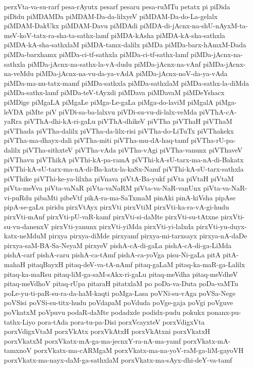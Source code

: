 {perxVta-va-su-rarf
pesa-rAyutx
pesarf
pesaru
pesa-ruMTu
petatx
pi
piDida
piDidu
piMDAMDa
piMDAM-Da-da-lilxyeV
piMDAM-Da-do-La-gelalx
piMDAM-DakUkx
piMDAM-Davu
piMDAdi
piMDA-di-jAcnx-na-shU-nAyxM-ta-meV-koV-tatx-ra-sha-ta-sathx-lamf
piMDA-kAsha
piMDA-kA-sha-sathxla
piMDA-kA-sha-sathxlaM
piMDA-tamx-dalilx
piMDa
piMDa-barx-hAmxM-Dada
piMDa-barxhamx
piMDa-ci-tf-sathxla
piMDa-ci-tf-sathx-lamf
piMDa-jAcnx-na-sathxla
piMDa-jAcnx-na-sathx-la-vA-dudu
piMDa-jAcnx-na-vAnf
piMDa-jAcnx-na-veMdu
piMDa-jAcnx-na-vu-da-ya-vAdA
piMDa-jAcnx-noV-da-ya-vAda
piMDa-ma-nu-tatx-mamf
piMDa-sathxla
piMDa-sathxlaM
piMDa-sathx-la-diMda
piMDa-sathx-lamf
piMDa-teV-tAyxdi
piMDava
piMDavaM
piMDeYshacx
piMDige
piMgaLA
piMgaLe
piMga-Le-gaLa
piMga-do-laviM
piMgalA
piMga-leVDA
piMte
piV
piVDi-sa-ba-lalxvu
piVDi-su-vu-di-lalx-veMda
piVThA-cA-yaRra
piVThA-dhi-kA-ri-gaLu
piVThA-dhikeV
piVTha
piVThaH
piVThaM
piVThada
piVTha-dalilx
piVTha-da-lilx-risi
piVTha-do-LiTuTx
piVThakekx
piVTha-ma-dhayx-dali
piVTha-miti
piVTha-mu-dA-haq-tamf
piVTha-rU-pa-dalilx
piVTha-sithxteV
piVTha-vAda
piVTha-vAgi
piVTha-vanunx
piVThaveV
piVThavu
piVThikA
piVThi-kA-pa-ramA
piVThi-kA-sU-tarx-ma-nA-di-Bakatx
piVThi-kA-sU-tarx-ma-nA-di-Ba-katx-la-kaSx-Namf
piVThi-kA-sU-tarx-sathxla
piVThike
piVThi-ke-ya-lilxha
piVnava
piVtA-Ba-yukf
piVta
piVtaH
piVtaM
piVta-meVva
piVta-vaNaR
piVta-vaNaRM
piVta-va-NaR-vanUnx
piVta-va-NaR-vi-puRdu
pibaMti
pibeVtf
pikA-ra-ma-SaTxmaM
pinAki
pinA-kiVsha
pipAse
pipA-se-gaLu
piridu
pirxVtAyx
pirxVti
pirxVtiM
pirxVti-ka-ra-vA-gi-hudu
pirxVti-mAnf
pirxVti-pU-vaR-kamf
pirxVti-si-daMte
pirxVti-su-tAtxne
pirxVti-su-vu-danenxV
pirxVti-yanunx
pirxVti-yiMda
pirxVti-yi-lalxda
pirxVti-yu-duyx-katx-neMduM
pirxya
pirxya-diMde
pirxyamf
pirxya-mi-tarxsayx
pirxya-nA-daDe
pirxya-saM-BA-Sa-NeyaM
pirxyeV
pishA-cA-di-gaLa
pishA-cA-di-ga-LiMda
pishA-carf
pishA-caru
pishA-ca-tAmf
pishA-ca-yoVga
pisu-Ni-gaLa
pitA
pitA-mahaH
pitaqBayxH
pitaq-deV-va-tA-nAmf
pitaq-gaLaM
pitaq-ka-maR-ga-Lalilx
pitaq-ka-maRsu
pitaq-liM-ga-saM-sAkx-ri-gaLu
pitaq-meVdha
pitaq-meVdheV
pitaq-meVdhoV
pitaq-rUpa
pitaraH
pitatxlaM
po
poDa-va-Duta
poDa-vaMTu
poLe-yu-ti-paR-su-ra-da-haM-kaqti
poMga-Lasa
poVNi-su-vAga
poVSa-Nege
poVSisi
poVSi-su-titx-hudu
poVdapaM
poVduda
poVge-gaja
poVgi
poVguve
poVkatxM
poVpuvu
podaR-daMte
podadxde
podidx-pudu
pokukx
ponanx-pu-tathx-Liyo
pora-tAda
pora-tu-pa-Disi
porxVcayxteV
porxVdigxVta
porxVdigxVtaM
porxVkAtx
porxVkAtxH
porxVkAtxni
porxVkatxH
porxVkatxM
porxVkatx-mA-ga-ma-jecnxY-ra-nA-ma-yamf
porxVkatx-mA-tamxnoV
porxVkatx-ma-cARMgaM
porxVkatx-ma-na-yoV-raM-ga-liM-gayoVH
porxVkatx-ma-nayx-daM-ga-sathxlaM
porxVkatx-ma-sAyx-dhi-deY-va-tamf
}
